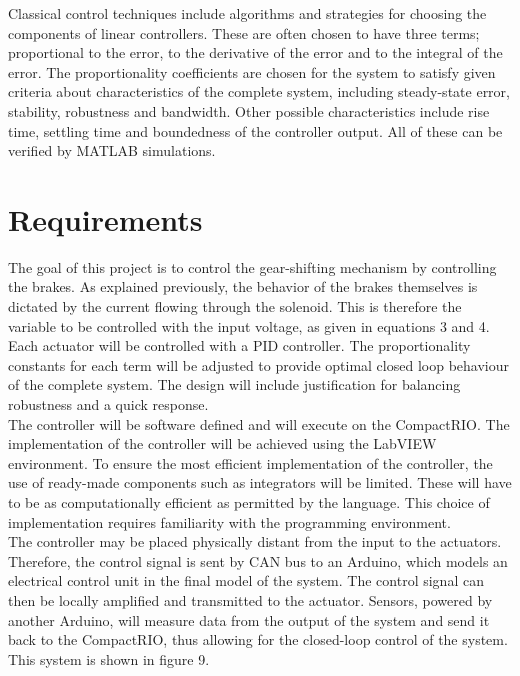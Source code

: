 \documentclass{article}
\begin{document}
\noindent Classical control techniques include algorithms and strategies for choosing the components of linear controllers. These are often chosen to have three terms; proportional to the error, to the derivative of the error and to the integral of the error. The proportionality coefficients are chosen for the system to satisfy given criteria about characteristics of the complete system, including steady-state error, stability, robustness and bandwidth. Other possible characteristics include rise time, settling time and boundedness of the controller output. All of these can be verified by MATLAB simulations.


\section{Requirements}
The goal of this project is to control the gear-shifting mechanism by controlling the brakes. As explained previously, the behavior of the brakes themselves is dictated by the current flowing through the solenoid. This is therefore the variable to be controlled with the input voltage, as given in equations 3 and 4. Each actuator will be controlled with a PID controller. The proportionality constants for each term will be adjusted to provide optimal closed loop behaviour of the complete system. The design will include justification for balancing robustness and a quick response.\\ 

\noindent The controller will be software defined and will execute on the CompactRIO. The implementation of the controller will be achieved using the LabVIEW environment. To ensure the most efficient implementation of the controller, the use of ready-made components such as integrators will be limited. These will have to be as computationally efficient as permitted by the language. This choice of implementation requires familiarity with the programming environment.\\

\noindent The controller may be placed physically distant from the input to the actuators. Therefore, the control signal is sent by CAN bus to an Arduino, which models an electrical control unit in the final model of the system. The control signal can then be locally amplified and transmitted to the actuator. Sensors, powered by another Arduino, will measure data from the output of the system and send it back to the CompactRIO, thus allowing for the closed-loop control of the system. This system is shown in figure 9.\\
\end{document}
